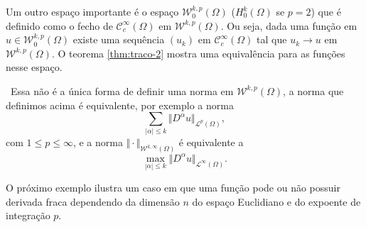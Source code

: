 \documentclass[a4paper, 11pt]{book}
\theoremstyle{definition}
\newcommand{\obs}{\noindent{\textbf{\textcolor{black}{\sffamily Observação:}}}~}
\newcommand{\cC}{\mathcal{C}}
\newcommand{\cL}{\mathcal{L}}
\newcommand{\cW}{\mathcal{W}}
\begin{document}
Um outro espaço importante é o espaço $\cW^{k,p}_0(\Omega)$ ($H^k_0(\Omega)$ se $p = 2$) que é definido como o fecho de $\cC^{\infty}_c(\Omega)$ em $\cW^{k,p}(\Omega)$. Ou seja, dada uma função em $u \in \cW^{k,p}_0(\Omega)$ existe uma sequência $(u_k)$ em $\cC^{\infty}_c(\Omega)$ tal que $u_k \to u$ em $\cW^{k,p}(\Omega)$.
O teorema \ref{thm:traco-2} mostra uma equivalência para as funções nesse espaço.

\obs Essa não é a única forma de definir uma norma em $\cW^{k,p}(\Omega)$, a norma que definimos acima é equivalente, por exemplo a norma
\[
    \sum_{|\alpha| \leqslant k} \Vert D^\alpha u \Vert_{\cL^p(\Omega)},
\]
com $1 \leqslant p \leqslant \infty$, e a norma $\Vert \cdot \Vert_{\cW^{k,\infty}(\Omega)}$ é equivalente a
\[
    \max_{|\alpha|\leqslant k} \Vert D^\alpha u \Vert_{\cL^\infty(\Omega)}.
\]

O próximo exemplo ilustra um caso em que uma função pode ou não possuir derivada fraca dependendo da dimensão $n$ do espaço Euclidiano e do expoente de integração $p$.
\end{document}

